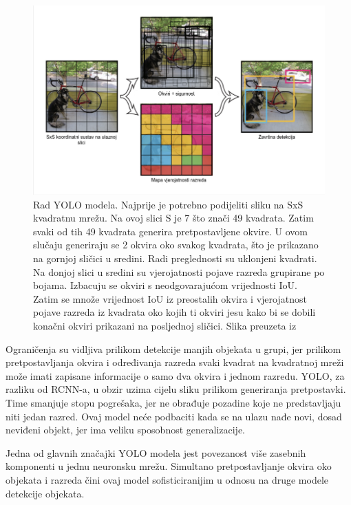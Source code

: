 \begin{figure}[htb]
    \centering
    \includegraphics[width=12cm]{img/YOLO-process.png}
    \caption{Rad YOLO modela. Najprije je potrebno podijeliti sliku na SxS kvadratnu mrežu. Na ovoj slici S je 7 što znači 49 kvadrata.
    Zatim svaki od tih 49 kvadrata generira pretpostavljene okvire. U ovom slučaju generiraju se 2 okvira oko svakog kvadrata, što je prikazano na gornjoj sličici u sredini.
    Radi preglednosti su uklonjeni kvadrati. Na donjoj slici u sredini su vjerojatnosti pojave razreda grupirane po bojama. Izbacuju se 
    okviri s neodgovarajućom vrijednosti IoU. Zatim se množe vrijednost IoU iz preostalih okvira i vjerojatnost pojave razreda iz kvadrata oko kojih ti okviri jesu
    kako bi se dobili konačni okviri prikazani na posljednoj sličici. 
     Slika preuzeta iz \citep{DBLP:journals/corr/RedmonDGF15}}
    \label{fig:Rad YOLO modela} 
\end{figure}

Ograničenja su vidljiva prilikom detekcije manjih objekata u grupi, jer prilikom pretpostavljanja okvira  i određivanja 
razreda svaki kvadrat na kvadratnoj mreži može imati zapisane informacije o samo dva okvira i jednom razredu. 
YOLO, za razliku od RCNN-a, u obzir uzima cijelu sliku prilikom generiranja pretpostavki. Time smanjuje
stopu pogrešaka, jer ne obrađuje pozadine koje ne predstavljaju niti jedan razred. Ovaj model neće podbaciti kada se na ulazu nađe novi, dosad neviđeni 
objekt, jer ima veliku sposobnost generalizacije. \citep{DBLP:journals/corr/RedmonDGF15}   

Jedna od glavnih značajki YOLO modela jest povezanost više zasebnih komponenti u jednu neuronsku mrežu. 
Simultano pretpostavljanje okvira oko objekata i razreda čini ovaj model sofisticiranijim u odnosu na druge modele detekcije objekata. 


